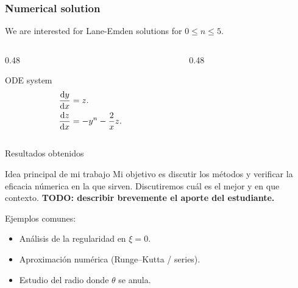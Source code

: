 


\begin{frame}[plain]
    \setTitlestyleDissertation
    \titlepage
\end{frame}





\begin{frame}
    \frametitle{Numerical solution}
    We are interested for Lane-Emden solutions for $0\leq n\leq 5$.
    \begin{columns}[t]
        \begin{column}{0.48\textwidth}
            \begin{block}{ODE system}
                \begin{align*}
                    \diff{y}{x} & =
                    z.              \\
                    \diff{z}{x} & =
                    -y^{n}-\frac{2}{x}z.
                \end{align*}
            \end{block}
        \end{column}
        \begin{column}{0.48\textwidth}
        \end{column}
    \end{columns}
\end{frame}

\begin{frame}{Resultados obtenidos}
    \begin{block}{Idea principal de mi trabajo}
        Mi objetivo es discutir los métodos y verificar la eficacia númerica en la que sirven.
        Discutiremos cuál es el mejor y en que contexto.
        \textbf{TODO: describir brevemente el aporte del estudiante.}

        Ejemplos comunes:
        \begin{itemize}
            \item Análisis de la regularidad en \(\xi=0\).
            
            \item Aproximación numérica (Runge--Kutta / series).
            
            \item Estudio del radio donde \(\theta\) se anula.
        \end{itemize}
    \end{block}
\end{frame}

